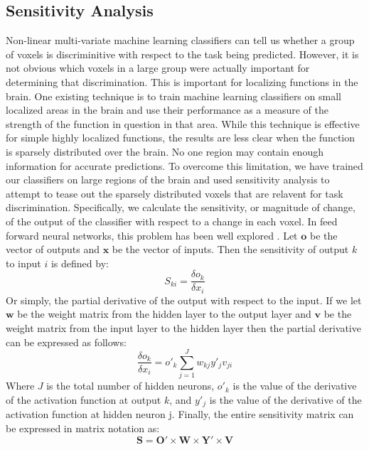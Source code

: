 \documentclass[twocolumn,final]{article}
\begin{document}
\subsection{Sensitivity Analysis}
Non-linear multi-variate machine learning classifiers can tell us whether a group of voxels is discriminitive with respect to the task being predicted.
However, it is not obvious which voxels in a large group were actually important for determining that discrimination.
This is important for localizing functions in the brain.
One existing technique is to train machine learning classifiers on small localized areas in the brain and use their performance as a measure of the strength of the function in question in that area.
While this technique is effective for simple highly localized functions, the results are less clear when the function is sparsely distributed over the brain.
No one region may contain enough information for accurate predictions.
To overcome this limitation, we have trained our classifiers on large regions of the brain and used sensitivity analysis to attempt to tease out the sparsely distributed voxels that are relavent for task discrimination.
Specifically, we calculate the sensitivity, or magnitude of change, of the output of the classifier with respect to a change in each voxel.
In feed forward neural networks, this problem has been well explored \cite{Zurada1994}.
Let $\mathbf{o}$ be the vector of outputs and $\mathbf{x}$ be the vector of inputs.
Then the sensitivity of output $k$ to input $i$ is defined by:
\begin{equation}
S_{ki} = \frac{\delta o_{k}}{\delta x_{i}}
\end{equation}
Or simply, the partial derivative of the output with respect to the input.
If we let $\mathbf{w}$ be the weight matrix from the hidden layer to the output layer and $\mathbf{v}$ be the weight matrix from the input layer to the hidden layer then the partial derivative can be expressed as follows:
\begin{equation}
\frac{\delta o_{k}}{\delta x_{i}} = o'_{k} \sum^{J}_{j=1}{w_{kj}y'_{j}v_{ji}}
\end{equation}
Where $J$ is the total number of hidden neurons,  $o'_{k}$ is the value of the derivative of the activation function at output $k$, and $y'_{j}$ is the value of the derivative of the activation function at hidden neuron {j}.
Finally, the entire sensitivity matrix can be expressed in matrix notation as:
\begin{equation}
\mathbf{S} = \mathbf{O}' \times \mathbf{W} \times \mathbf{Y}' \times \mathbf{V}
\end{equation}
\end{document}
